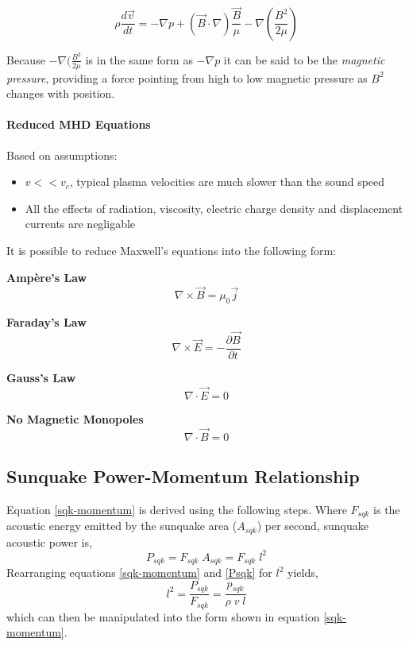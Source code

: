 \begin{equation}\label{maghydstat}
\rho\frac{d\vec{v}}{dt}= -\nabla p + (\vec{B}\cdot\nabla)\frac{\vec{B}}{\mu}-\nabla(\frac{B^2}{2\mu}) 
\end{equation}

Because $-\nabla(\frac{B^2}{2\mu}$ is in the same form as $-\nabla p$ it can be said to be the \emph{magnetic pressure}, providing a force pointing from high to low magnetic pressure as $B^2$ changes with position.

\paragraph{Reduced MHD Equations}
Based on assumptions:
\begin{itemize}
\item $v<<v_{c}$, typical plasma velocities are much slower than the sound speed 
\item All the effects of radiation, viscosity, electric charge density and displacement currents are negligable 
\end{itemize}
It is possible to reduce Maxwell's equations into the following form:

\textbf{Ampère's Law}
\begin{equation}\label{max1:ampere}
\nabla\times\vec{B}=\mu_{0}\vec{j}
\end{equation}

\textbf{Faraday's Law}
\begin{equation}\label{max2:faraday}
\nabla\times\vec{E}=-\frac{\partial \vec{B}}{\partial t}
\end{equation}

\textbf{Gauss's Law}
\begin{equation}\label{max3:gauss}
\nabla\cdot\vec{E}=0
\end{equation}

\textbf{No Magnetic Monopoles}
\begin{equation}\label{max4:nomonopole}
\nabla\cdot\vec{B}=0
\end{equation}




\subsection{Sunquake Power-Momentum Relationship}\label{sqk-ptoP-relation}
Equation \ref{sqk-momentum} is derived using the following steps. Where $F_{sqk}$ is the acoustic energy emitted by the sunquake area ($A_{sqk}$) per second, sunquake acoustic power is, 
\begin{equation}
P_{sqk} = F_{sqk} \; A_{sqk} = F_{sqk} \; l^2
\end{equation}\label{Psqk}
Rearranging equations \ref{sqk-momentum} and \ref{Psqk} for $l^{2}$ yields,
\begin{equation}
l^2 = \frac{P_{sqk}}{F_{sqk}} = \frac{p_{sqk}}{\rho \; v \; l} 
\end{equation}\label{l^2}
which can then be manipulated into the form shown in equation \ref{sqk-momentum}. 



